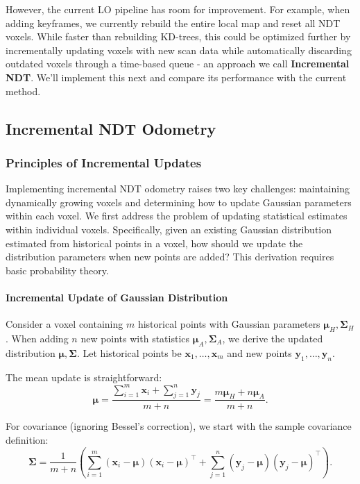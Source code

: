 However, the current LO pipeline has room for improvement. For example, when adding keyframes, we currently rebuild the entire local map and reset all NDT voxels. While faster than rebuilding KD-trees, this could be optimized further by incrementally updating voxels with new scan data while automatically discarding outdated voxels through a time-based queue - an approach we call \textbf{Incremental NDT}. We'll implement this next and compare its performance with the current method.

\subsection{Incremental NDT Odometry}
\label{sec:inc-ndt}
\subsubsection{Principles of Incremental Updates}
Implementing incremental NDT odometry raises two key challenges: maintaining dynamically growing voxels and determining how to update Gaussian parameters within each voxel. We first address the problem of updating statistical estimates within individual voxels. Specifically, given an existing Gaussian distribution estimated from historical points in a voxel, how should we update the distribution parameters when new points are added? This derivation requires basic probability theory.

\paragraph{Incremental Update of Gaussian Distribution}
Consider a voxel containing $m$ historical points with Gaussian parameters $\boldsymbol{\mu}_H, \boldsymbol{\Sigma}_H$. When adding $n$ new points with statistics $\boldsymbol{\mu}_A, \boldsymbol{\Sigma}_A$, we derive the updated distribution $\boldsymbol{\mu}, \boldsymbol{\Sigma}$. Let historical points be $\mathbf{x}_1, \ldots, \mathbf{x}_m$ and new points $\mathbf{y}_1, \ldots, \mathbf{y}_n$.

The mean update is straightforward:
\begin{equation}\label{key}
	\boldsymbol{\mu} = \frac{\sum_{i=1}^m \mathbf{x}_i + \sum_{j=1}^n \mathbf{y}_j}{m+n} = \frac{m \boldsymbol{\mu}_H + n\boldsymbol{\mu}_A}{m+n}.
\end{equation}

For covariance (ignoring Bessel's correction), we start with the sample covariance definition:
\begin{equation}\label{eq:7.18}
	\boldsymbol{\Sigma} = \frac{1}{m+n} \left( \sum_{i=1}^{m} (\mathbf{x}_i - \boldsymbol{\mu})(\mathbf{x}_i - \boldsymbol{\mu})^\top + \sum_{j=1}^{n} (\mathbf{y}_j - \boldsymbol{\mu})(\mathbf{y}_j - \boldsymbol{\mu})^\top \right).
\end{equation}

